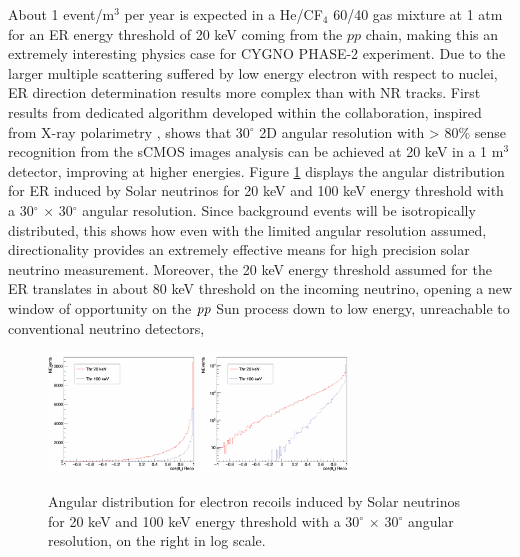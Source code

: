 \documentclass[physics,article,submit,moreauthors,pdftex]{Definitions/mdpi}
\begin{document}
About 1 event/m$^3$ per year is expected in a He/CF$_4$ 60/40 gas mixture at 1 atm for an ER energy threshold of 20 keV coming from the $pp$ chain, making this an extremely interesting physics case for CYGNO PHASE-2 experiment. Due to the larger multiple scattering suffered by low energy electron with respect to nuclei, ER direction determination results more complex than with NR tracks. First results from dedicated algorithm developed within the collaboration, inspired from X-ray polarimetry \cite{Soffitta:2012hx}, shows that 30$^{\circ}$ 2D angular resolution with > 80$\%$ sense recognition from the sCMOS images analysis can be achieved at 20 keV in a 1 m$^3$ detector, improving at higher energies. Figure \ref{fig:neutrino} displays the angular distribution for ER induced by Solar neutrinos for 20 keV and 100 keV energy threshold with a 30$^{\circ}$ $\times$ 30$^{\circ}$ angular resolution. Since background events will be isotropically distributed, this shows how even with the limited angular resolution assumed, directionality provides an extremely effective means for high precision solar neutrino measurement. Moreover, the 20 keV energy threshold assumed for the ER translates in about 80 keV threshold on the incoming neutrino,
opening a new window of opportunity on the $\emph{pp}$ Sun process down to low energy, unreachable to conventional neutrino detectors\cite{Seguinot:1992zu},


\begin{figure}[t!]
\centering
 \includegraphics[width=0.35\textwidth]{solar_neutrino_spectrum_20_100_keV.png}
 \includegraphics[width=0.35\textwidth]{solar_neutrino_spectrum_20_100_keV_log.png}
 \caption{Angular distribution for electron recoils induced by Solar neutrinos for 20 keV and 100 keV energy threshold with a 30$^{\circ}$ $\times$ 30$^{\circ}$ angular resolution, on the right in log scale.}
 \label{fig:neutrino}
 \end{figure}
\end{document}
